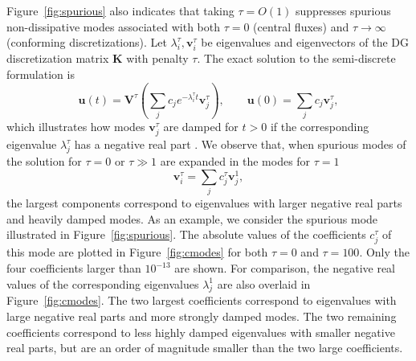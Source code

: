 \documentclass[preprint,10pt]{elsarticle}
\newcommand{\LRp}[1]{\left( #1 \right)}
\begin{document}
Figure~\ref{fig:spurious} also indicates that taking $\tau = O(1)$ suppresses spurious non-dissipative modes associated with both $\tau = 0$ (central fluxes) and $\tau\rightarrow \infty$ (conforming discretizations).  Let $\lambda^{\tau}_i, \bm{v}^{\tau}_i$ be eigenvalues and eigenvectors of the DG discretization matrix $\bm{K}$ with penalty $\tau$.  The exact solution to the semi-discrete formulation is 
\[
\bm{u}(t) =\bm{V}^{\tau}\LRp{ \sum_j c_j e^{-\lambda_i^{\tau} t} \bm{v}^{\tau}_j}, \qquad \bm{u}(0) = \sum_j c_j\bm{v}^{\tau}_j,
\]
which illustrates how modes $\bm{v}^{\tau}_j$ are damped for $t > 0$ if the corresponding eigenvalue $\lambda^{\tau}_j$ has a negative real part .  We observe that, when spurious modes of the solution for $\tau = 0$ or $\tau \gg 1$ are expanded in the modes for $\tau = 1$
\[
\bm{v}^{\tau}_i = \sum_j c^\tau_j \bm{v}^{1}_j, 
\]
the largest components correspond to eigenvalues with larger negative real parts and heavily damped modes.  As an example, we consider the spurious mode illustrated in Figure~\ref{fig:spurious}.  The absolute values of the coefficients $c^\tau_j$ of this mode are plotted in Figure~\ref{fig:cmodes} for both $\tau = 0$ and $\tau = 100$.  Only the four coefficients larger than $10^{-13}$ are shown.  For comparison, the negative real values of the corresponding eigenvalues $\lambda^1_j$ are also overlaid in Figure~\ref{fig:cmodes}.  The two largest coefficients correspond to eigenvalues with large negative real parts and more strongly damped modes.  The two remaining coefficients correspond to less highly damped eigenvalues with smaller negative real parts, but are an order of magnitude smaller than the two large coefficients.  
\end{document}
